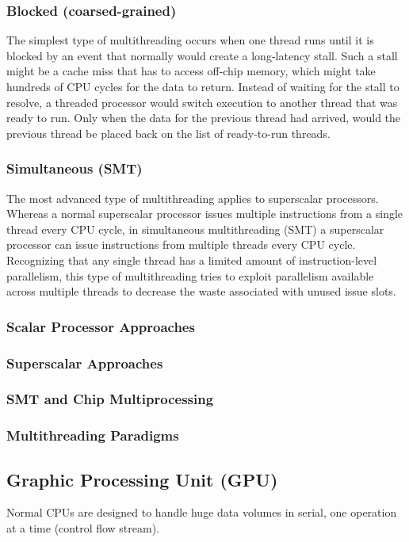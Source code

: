 \subsubsection{Blocked (coarsed-grained)}
The simplest type of multithreading occurs when one thread runs until it is blocked by an event that normally would create a long-latency stall. Such a stall might be a cache miss that has to access off-chip memory, which might take hundreds of CPU cycles for the data to return. Instead of waiting for the stall to resolve, a threaded processor would switch execution to another thread that was ready to run. Only when the data for the previous thread had arrived, would the previous thread be placed back on the list of ready-to-run threads.

\subsubsection{Simultaneous (SMT)}
The most advanced type of multithreading applies to superscalar processors. Whereas a normal superscalar processor issues multiple instructions from a single thread every CPU cycle, in simultaneous multithreading (SMT) a superscalar processor can issue instructions from multiple threads every CPU cycle. Recognizing that any single thread has a limited amount of instruction-level parallelism, this type of multithreading tries to exploit parallelism available across multiple threads to decrease the waste associated with unused issue slots.

\subsubsection{Scalar Processor Approaches}
\subsubsection{Superscalar Approaches}
\subsubsection{SMT and Chip Multiprocessing}
\subsubsection{Multithreading Paradigms}




\subsection{Graphic Processing Unit (GPU)}
Normal CPUs are designed to handle huge data volumes in serial, one operation at a time (control flow stream).

